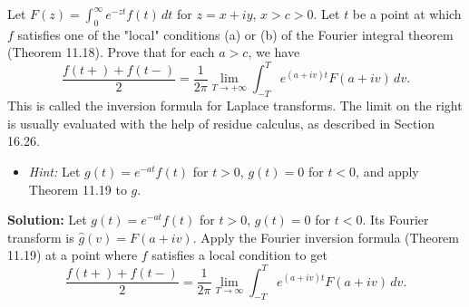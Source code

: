 \begin{problembox}
Let $F(z) = \int_0^\infty e^{-zt} f(t) \, dt$ for $z = x + iy$, $x > c > 0$. Let $t$ be a point at which $f$ satisfies one of the "local" conditions (a) or (b) of the Fourier integral theorem (Theorem 11.18). Prove that for each $a > c$, we have
\[
\frac{f(t+) + f(t-)}{2} = \frac{1}{2\pi} \lim_{T \to +\infty} \int_{-T}^T e^{(a + iv)t} F(a + iv) \, dv.
\]
This is called the inversion formula for Laplace transforms. The limit on the right is usually evaluated with the help of residue calculus, as described in Section 16.26.
\begin{itemize}
\item \textit{Hint:} Let $g(t) = e^{-at} f(t)$ for $t > 0$, $g(t) = 0$ for $t < 0$, and apply Theorem 11.19 to $g$.
\end{itemize}
\end{problembox}

\noindent\textbf{Solution:}
Let $g(t)=e^{-at}f(t)$ for $t>0$, $g(t)=0$ for $t<0$. Its Fourier transform is $\widehat g(v)=F(a+iv)$. Apply the Fourier inversion formula (Theorem 11.19) at a point where $f$ satisfies a local condition to get
\[\frac{f(t+)+f(t-)}{2}=\frac{1}{2\pi}\lim_{T\to\infty}\int_{-T}^T e^{(a+iv)t}F(a+iv)\,dv.\]

